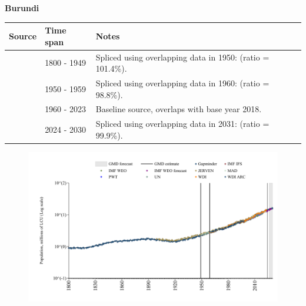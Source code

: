 \documentclass[12pt,a4paper,landscape]{article}
\begin{document}
\begin{adjustbox}{max totalsize={\paperwidth}{\paperheight},center}
\begin{minipage}[t][\textheight][t]{\textwidth}
\vspace*{0.5cm}
{}
\begin{center}
{\Large\bfseries Burundi}
\end{center}
\vspace{0.5cm}
\begin{table}[H]
\centering
\small
\begin{tabular}{|l|l|l|}
\hline
\textbf{Source} & \textbf{Time span} & \textbf{Notes} \\
\hline
\rowcolor{white}\cite{Gapminder}& 1800 - 1949 &Spliced using overlapping data in 1950: (ratio = 101.4\%).\\
\rowcolor{lightgray}\cite{IMF_IFS}& 1950 - 1959 &Spliced using overlapping data in 1960: (ratio = 98.8\%).\\
\rowcolor{white}\cite{WDI}& 1960 - 2023 &Baseline source, overlaps with base year 2018.\\
\rowcolor{lightgray}\cite{Gapminder}& 2024 - 2030 &Spliced using overlapping data in 2031: (ratio = 99.9\%).\\
\hline
\end{tabular}
\end{table}
\begin{figure}[H]
\centering
\includegraphics[width=\textwidth,height=0.6\textheight,keepaspectratio]{graphs/BDI_pop.pdf}
\end{figure}
\end{minipage}
\end{adjustbox}
\end{document}
